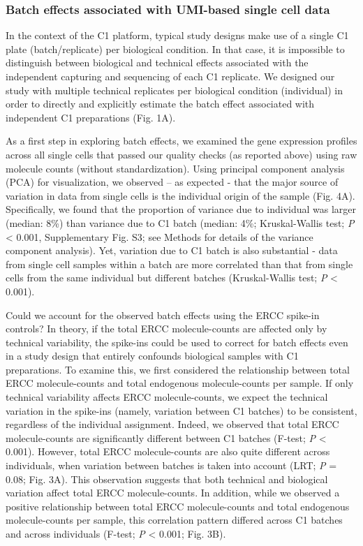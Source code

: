 \subsubsection{Batch effects associated with UMI-based single cell
data}\label{batch-effects-associated-with-umi-based-single-cell-data}

In the context of the C1 platform, typical study designs make use of a
single C1 plate (batch/replicate) per biological condition. In that
case, it is impossible to distinguish between biological and technical
effects associated with the independent capturing and sequencing of each
C1 replicate. We designed our study with multiple technical replicates
per biological condition (individual) in order to directly and
explicitly estimate the batch effect associated with independent C1
preparations (Fig. 1A).

As a first step in exploring batch effects, we examined the gene
expression profiles across all single cells that passed our quality
checks (as reported above) using raw molecule counts (without
standardization). Using principal component analysis (PCA) for
visualization, we observed -- as expected - that the major source of
variation in data from single cells is the individual origin of the
sample (Fig. 4A). Specifically, we found that the proportion of variance
due to individual was larger (median: 8\%) than variance due to C1 batch
(median: 4\%; Kruskal-Wallis test; \emph{P} \textless{} 0.001,
Supplementary Fig. S3; see Methods for details of the variance component
analysis). Yet, variation due to C1 batch is also substantial - data
from single cell samples within a batch are more correlated than that
from single cells from the same individual but different batches
(Kruskal-Wallis test; \emph{P} \textless{} 0.001).

Could we account for the observed batch effects using the ERCC spike-in
controls? In theory, if the total ERCC molecule-counts are affected only
by technical variability, the spike-ins could be used to correct for
batch effects even in a study design that entirely confounds biological
samples with C1 preparations. To examine this, we first considered the
relationship between total ERCC molecule-counts and total endogenous
molecule-counts per sample. If only technical variability affects ERCC
molecule-counts, we expect the technical variation in the spike-ins
(namely, variation between C1 batches) to be consistent, regardless of
the individual assignment. Indeed, we observed that total ERCC
molecule-counts are significantly different between C1 batches (F-test;
\emph{P} \textless{} 0.001). However, total ERCC molecule-counts are
also quite different across individuals, when variation between batches
is taken into account (LRT; \emph{P} = 0.08; Fig. 3A). This observation
suggests that both technical and biological variation affect total ERCC
molecule-counts. In addition, while we observed a positive relationship
between total ERCC molecule-counts and total endogenous molecule-counts
per sample, this correlation pattern differed across C1 batches and
across individuals (F-test; \emph{P} \textless{} 0.001; Fig. 3B).

